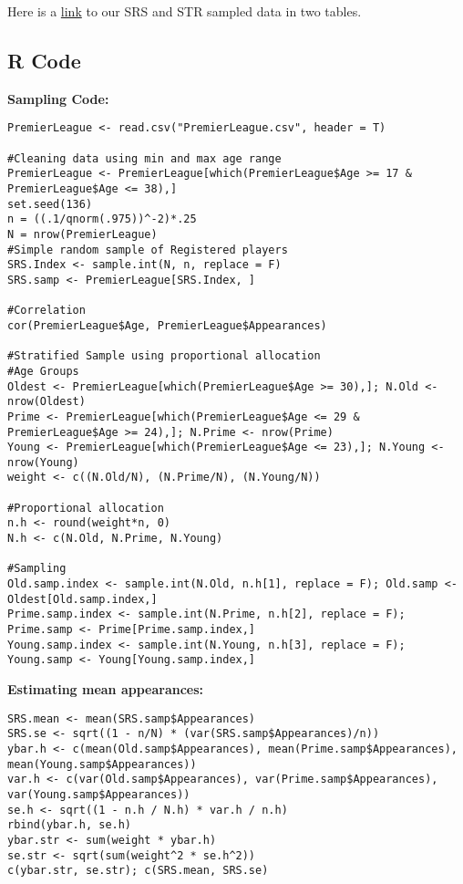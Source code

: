 \documentclass[paper=a4, fontsize=12pt,twoside]{article}	%
\begin{document}
\noindent Here is a \href{https://docs.google.com/spreadsheets/d/e/2PACX-1vRi-x_rYtvMzfZ5DgJ6yF3JohaZZHaaURFYOyofTwngdoQdyQRCQAndWH3eL6nD-EnjqOOzzwx6lFpz/pubhtml}{link} to our SRS and STR sampled data in two tables.



\subsection{R Code}

\textbf{Sampling Code:}
\begin{lstlisting}
PremierLeague <- read.csv("PremierLeague.csv", header = T)

#Cleaning data using min and max age range
PremierLeague <- PremierLeague[which(PremierLeague$Age >= 17 & PremierLeague$Age <= 38),]
set.seed(136)
n = ((.1/qnorm(.975))^-2)*.25
N = nrow(PremierLeague)
#Simple random sample of Registered players
SRS.Index <- sample.int(N, n, replace = F)
SRS.samp <- PremierLeague[SRS.Index, ]

#Correlation
cor(PremierLeague$Age, PremierLeague$Appearances)

#Stratified Sample using proportional allocation
#Age Groups
Oldest <- PremierLeague[which(PremierLeague$Age >= 30),]; N.Old <- nrow(Oldest)
Prime <- PremierLeague[which(PremierLeague$Age <= 29 & PremierLeague$Age >= 24),]; N.Prime <- nrow(Prime)
Young <- PremierLeague[which(PremierLeague$Age <= 23),]; N.Young <- nrow(Young)
weight <- c((N.Old/N), (N.Prime/N), (N.Young/N))

#Proportional allocation
n.h <- round(weight*n, 0)
N.h <- c(N.Old, N.Prime, N.Young)

#Sampling
Old.samp.index <- sample.int(N.Old, n.h[1], replace = F); Old.samp <- Oldest[Old.samp.index,]
Prime.samp.index <- sample.int(N.Prime, n.h[2], replace = F); Prime.samp <- Prime[Prime.samp.index,]
Young.samp.index <- sample.int(N.Young, n.h[3], replace = F); Young.samp <- Young[Young.samp.index,]
\end{lstlisting}

\noindent \textbf{Estimating mean appearances:}
\begin{lstlisting}
SRS.mean <- mean(SRS.samp$Appearances)
SRS.se <- sqrt((1 - n/N) * (var(SRS.samp$Appearances)/n))
ybar.h <- c(mean(Old.samp$Appearances), mean(Prime.samp$Appearances), mean(Young.samp$Appearances))
var.h <- c(var(Old.samp$Appearances), var(Prime.samp$Appearances), var(Young.samp$Appearances))
se.h <- sqrt((1 - n.h / N.h) * var.h / n.h)
rbind(ybar.h, se.h)
ybar.str <- sum(weight * ybar.h)
se.str <- sqrt(sum(weight^2 * se.h^2))
c(ybar.str, se.str); c(SRS.mean, SRS.se)
\end{lstlisting}
\end{document}
